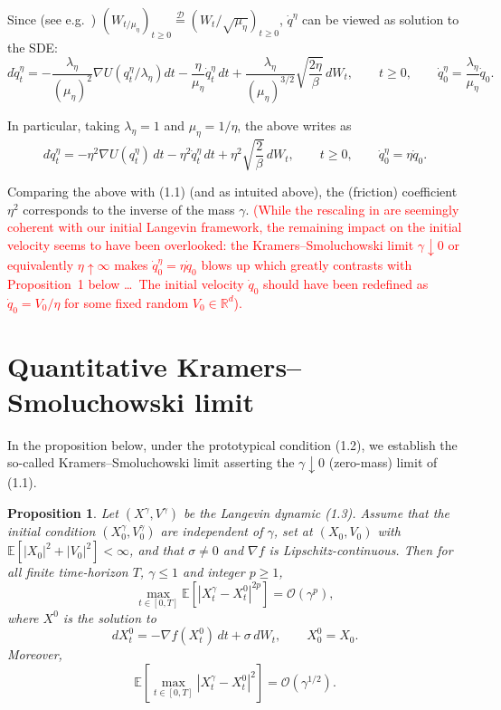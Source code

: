 \documentclass[11pt]{article}
\newtheorem{proposition}{Proposition}
\theoremstyle{remark}
\begin{document}

Since (see e.g.~\cite{4}) $(W_{t/\mu_\eta})_{t\ge0}\overset{\mathcal{D}}{=}(W_t/\sqrt{\mu_\eta})_{t\ge0}$, $\dot q^\eta$ can be viewed as solution to the SDE:
\[
d\dot q_t^\eta
=
-\frac{\lambda_\eta}{(\mu_\eta)^2}\nabla U\!\left(q_t^\eta/\lambda_\eta\right)dt
-\frac{\eta}{\mu_\eta}\dot q_t^\eta\,dt
+\frac{\lambda_\eta}{(\mu_\eta)^{3/2}}\sqrt{\frac{2\eta}{\beta}}\,dW_t,
\qquad t\ge0,
\qquad
\dot q_0^\eta=\frac{\lambda_\eta}{\mu_\eta}\dot q_0.
\]

In particular, taking $\lambda_\eta=1$ and $\mu_\eta=1/\eta$, the above writes as
\[
d\dot q_t^\eta
=
-\eta^2\nabla U(q_t^\eta)\,dt-\eta^2\dot q_t^\eta\,dt+\eta^2\sqrt{\frac{2}{\beta}}\,dW_t,
\qquad t\ge0,
\qquad
\dot q_0^\eta=\eta\dot q_0.
\]

Comparing the above with (1.1) (and as intuited above), the (friction) coefficient $\eta^2$ corresponds to the inverse of the mass $\gamma$.
\textcolor{red}{(While the rescaling in \cite{8} are seemingly coherent with our initial Langevin framework, the remaining impact on the initial velocity seems to have been overlooked: the Kramers--Smoluchowski limit $\gamma\downarrow 0$ or equivalently $\eta\uparrow\infty$ makes $\dot q_0^\eta=\eta\dot q_0$ blows up which greatly contrasts with Proposition~1 below \dots\ The initial velocity $\dot q_0$ should have been redefined as $\dot q_0=V_0/\eta$ for some fixed random $V_0\in\mathbb{R}^d$).}

\section{Quantitative Kramers--Smoluchowski limit}

In the proposition below, under the prototypical condition (1.2), we establish the so-called Kramers--Smoluchowski limit asserting the $\gamma\downarrow 0$ (zero-mass) limit of (1.1).

\begin{proposition}
Let $(X^\gamma,V^\gamma)$ be the Langevin dynamic (1.3).
Assume that the initial condition $(X_0^\gamma,V_0^\gamma)$ are independent of $\gamma$, set at $(X_0,V_0)$ with $\mathbb{E}\!\left[|X_0|^2+|V_0|^2\right]<\infty$, and that $\sigma\neq 0$ and $\nabla f$ is Lipschitz-continuous.
Then for all finite time-horizon $T$, $\gamma\le 1$ and integer $p\ge1$,
\begin{equation}
\max_{t\in[0,T]}\mathbb{E}\!\left[|X_t^\gamma-X_t^0|^{2p}\right]=\mathcal{O}(\gamma^p),
\tag{3.4}
\end{equation}
where $X^0$ is the solution to
\begin{equation}
dX_t^0=-\nabla f(X_t^0)\,dt+\sigma\,dW_t,\qquad X_0^0=X_0.
\tag{3.5}
\end{equation}
Moreover,
\begin{equation}
\mathbb{E}\!\left[\max_{t\in[0,T]}|X_t^\gamma-X_t^0|^2\right]=\mathcal{O}(\gamma^{1/2}).
\tag{3.6}
\end{equation}
\end{proposition}
\end{document}
